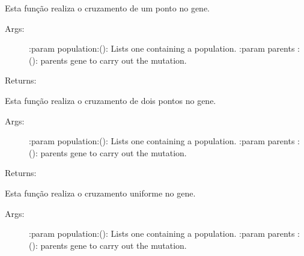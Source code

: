 \documentclass[letterpaper,10pt,english]{sphinxmanual}
\begin{document}
\begin{fulllineitems}
\begin{fulllineitems}
\label{\detokenize{index:ga.Genetic.cross_over_one_point}}
Esta função realiza o cruzamento de um ponto no gene.
\begin{description}
\item[{Args:}] \leavevmode
:param population:(): Lists one containing a population.
:param parents :(): parents gene to carry out the mutation.

\end{description}

Returns:

\end{fulllineitems}


\begin{fulllineitems}
\label{\detokenize{index:ga.Genetic.cross_over_two_points}}
Esta função realiza o cruzamento de dois pontos no gene.
\begin{description}
\item[{Args:}] \leavevmode
:param population:(): Lists one containing a population.
:param parents :(): parents gene to carry out the mutation.

\end{description}

Returns:

\end{fulllineitems}


\begin{fulllineitems}
\label{\detokenize{index:ga.Genetic.cross_over_uniform}}
Esta função realiza o cruzamento uniforme no gene.
\begin{description}
\item[{Args:}] \leavevmode
:param population:(): Lists one containing a population.
:param parents :(): parents gene to carry out the mutation.


\end{description}
\end{fulllineitems}
\end{fulllineitems}
\end{document}
